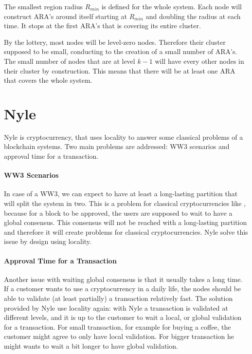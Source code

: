 \documentclass[a4paper,11pt,oneside]{report}
\begin{document}
The smallest region radius $R_{min}$ is defined for the whole system. Each node
will construct ARA's around itself starting at $R_{min}$ and doubling the
radius at each time. It stops at the first ARA's that is covering its entire
cluster. 

By the lottery, most nodes will be level-zero nodes. Therefore their cluster
supposed to be small, conducting to the creation of a small number of ARA's.
The small number of nodes that are at level $k-1$ will have every other nodes
in their cluster by construction. This means that there will be at least one
ARA that covers the whole system. 

\section{Nyle}

Nyle is cryptocurrency, that uses locality to answer some classical problems of
a blockchain systems. Two main problems are addressed: WW3 scenarios and
approval time for a transaction.
 
 \paragraph{WW3 Scenarios} \label{WW3} In case of a WW3, we can expect to have
 at least a long-lasting partition that will split the system in two. This is a
 problem for classical cryptocurrencies like \cite{bitcoin-paper}, because for a block to be approved,
 the users are supposed to wait to have a global consensus. This consensus will
 not be reached with a long-lasting partition and therefore it will create
 problems for classical cryptocurrencies. Nyle solve this issue by design using
 locality.

\paragraph{Approval Time for a Transaction} \label{approve_time} Another issue
with waiting global consensus is that it usually takes a long time. If a customer wants
to use a cryptocurrency in a daily life, the nodes should be 
able to validate (at least partially) a transaction relatively fast. The
solution provided by Nyle use locality again: with Nyle a transaction is
validated at different levels, and it is up to the customer to wait a local, or
global validation for a transaction. For small transaction, for example for buying a coffee, the customer might agree to only have local validation. For bigger transaction he might wants to wait a bit longer to have global validation.
\end{document}
